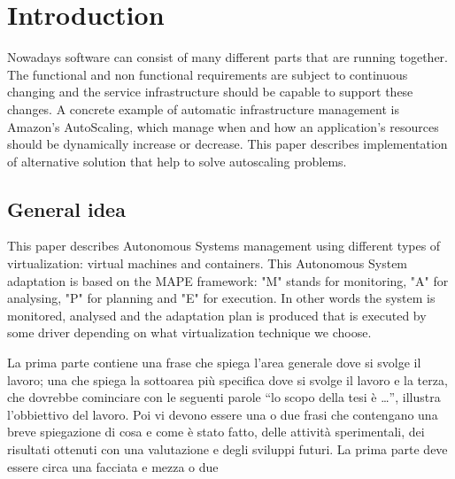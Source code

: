 \chapter{Introduction}
\label{introduction}
\thispagestyle{empty}

\noindent
Nowadays software can consist of many different parts that are running together. The functional and non functional requirements are subject to continuous changing and the service infrastructure should be capable to support these changes. A concrete example of automatic infrastructure management is Amazon's AutoScaling, which manage when and how an application's resources should be dynamically increase or decrease. This paper describes implementation of alternative solution that help to solve autoscaling problems.

\section{General idea}
\begin{sloppypar}This paper describes Autonomous Systems management using different types of virtualization: virtual machines and containers. This Autonomous System adaptation is based on the MAPE framework: "M" stands for monitoring, "A" for analysing, "P" for planning and "E" for execution. In other words the system is monitored, analysed and the adaptation plan is produced that is executed by some driver depending on what virtualization technique we choose.
\end{sloppypar}

\ifx La prima parte contiene una frase che spiega l'area generale dove si svolge il lavoro; una che spiega la sottoarea pi\`u specifica dove si svolge il lavoro e la terza, che dovrebbe cominciare con le seguenti parole ``lo scopo della tesi \`e \dots'', illustra l'obbiettivo del lavoro. Poi vi devono essere una o due frasi che contengano una breve spiegazione di cosa e come \`e stato fatto, delle attivit\`a sperimentali, dei risultati ottenuti con una valutazione e degli sviluppi futuri. La prima parte deve essere circa una facciata e mezza o due
\fi

